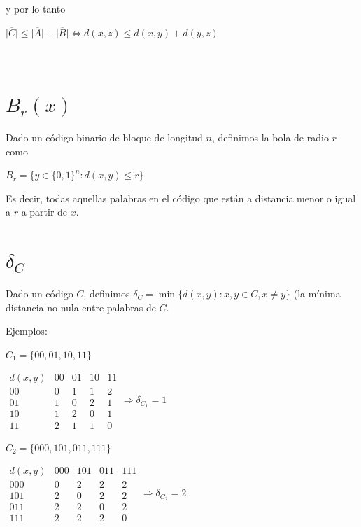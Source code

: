 \documentclass[10pt,a4paper]{article}
\begin{document}
y por lo tanto

\begin{center}
$\lvert \overline{C}\rvert \leq \lvert \overline{A}\rvert +\lvert \overline{B}\rvert \Leftrightarrow d(x,z) \leq d(x, y) + d(y, z)$
\end{center}

\begin{center}
 
\end{center}

\section*{$B_r(x)$}

Dado un código binario de bloque de longitud $n$, definimos la bola de radio $r$ como

\begin{center}
$B_r = \{y \in \{0, 1\}^n : d(x, y)\leq r\}$
\end{center}

Es decir, todas aquellas palabras en el código que están a distancia menor o igual a $r$ a partir de $x$.

\section*{$\delta_C$}

Dado un código $C$, definimos $\delta_C = \min\{d(x, y): x, y \in C, x \neq y\}$ (la mínima distancia no nula entre palabras de $C$.

Ejemplos:

$C_1 = \{00, 01, 10, 11\}$

\begin{center}
$\begin{array}{c|cccc}
d(x, y) & 00 & 01 & 10 & 11\\
\hline
00 & 0 & 1 &1 & 2 \\
01 & 1 & 0& 2 & 1\\
10 & 1 & 2 & 0 & 1\\
11 & 2 & 1 & 1 & 0
\end{array}
\Rightarrow \delta_{C_1} = 1$
\end{center}

$C_2 = \{000, 101, 011, 111\}$

\begin{center}
$\begin{array}{c|cccc}
d(x, y) & 00 0& 101 & 011 & 111\\
\hline
000 & 0 & 2 &2 & 2 \\
101 & 2 & 0& 2 & 2\\
011 & 2 & 2 & 0 & 2\\
111 & 2 & 2 & 2 & 0
\end{array}
\Rightarrow \delta_{C_2} = 2$
\end{center}
\end{document}
